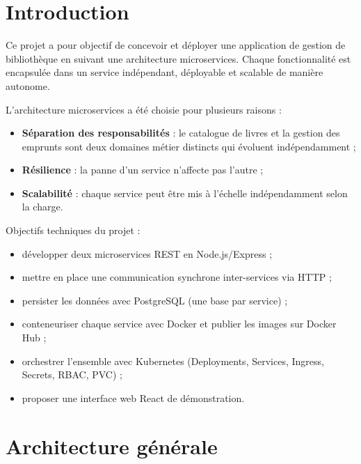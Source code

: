 \documentclass[12pt,a4paper]{article}
\begin{document}
\newpage
\tableofcontents
\newpage

\section{Introduction}

Ce projet a pour objectif de concevoir et déployer une application de gestion de bibliothèque
en suivant une architecture microservices. Chaque fonctionnalité est encapsulée dans un service
indépendant, déployable et scalable de manière autonome.

L'architecture microservices a été choisie pour plusieurs raisons :

\begin{itemize}[leftmargin=*]
  \item \textbf{Séparation des responsabilités} : le catalogue de livres et la gestion des emprunts
        sont deux domaines métier distincts qui évoluent indépendamment ;
  \item \textbf{Résilience} : la panne d'un service n'affecte pas l'autre ;
  \item \textbf{Scalabilité} : chaque service peut être mis à l'échelle indépendamment selon la charge.
\end{itemize}

Objectifs techniques du projet :

\begin{itemize}[leftmargin=*]
  \item développer deux microservices REST en Node.js/Express ;
  \item mettre en place une communication synchrone inter-services via HTTP ;
  \item persister les données avec PostgreSQL (une base par service) ;
  \item conteneuriser chaque service avec Docker et publier les images sur Docker Hub ;
  \item orchestrer l'ensemble avec Kubernetes (Deployments, Services, Ingress, Secrets, RBAC, PVC) ;
  \item proposer une interface web React de démonstration.
\end{itemize}

\section{Architecture générale}
\end{document}
